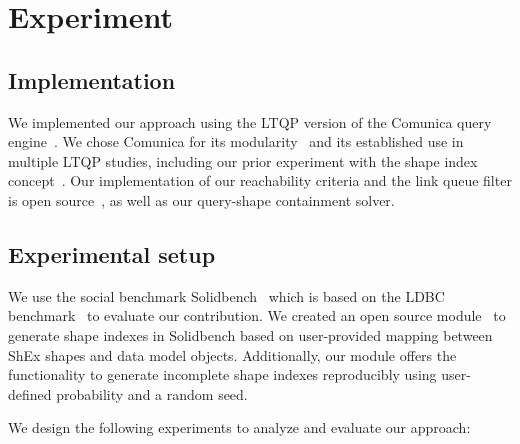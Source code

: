 \section{Experiment}




\subsection{Implementation}
We implemented our approach using the LTQP version of the Comunica query engine~\cite{taelman_iswc_resources_comunica_2018}. 
We chose Comunica for its modularity~\cite{taelman_swj_componentsjs_2022} and its established use in multiple LTQP studies, 
including our prior experiment with the shape index concept~\cite{Bogaerts2021LinkTW, Taelman2023, eschauzier_quweda_linkqueue_2023, Hanski2024, eschauzier_amw_rcubemetric_2024, tam2024opportunitiesshapebasedoptimizationlink}.
Our implementation of our reachability criteria and the link queue filter is open source~, as well as our query-shape containment solver.~

\subsection{Experimental setup}
We use the social benchmark Solidbench~\cite{Taelman2023} which is based on the LDBC benchmark~\cite{Angles2020} to evaluate our contribution.
We created an open source module~ to generate shape indexes in Solidbench based on user-provided mapping between ShEx shapes and data model objects.
Additionally, our module offers the functionality to generate incomplete shape indexes reproducibly using user-defined probability and a random seed.

We design the following experiments to analyze and evaluate our approach:

